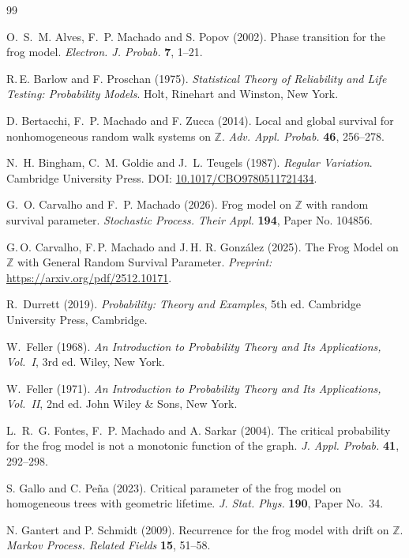 \documentclass[preprint]{imsart}
\newcommand{\1}{\mathbf{1}}
\theoremstyle{plain}
\theoremstyle{definition}
\begin{document}
\begin{thebibliography}{99}

O.~S.~M. Alves, F.~P. Machado and S. Popov (2002).
Phase transition for the frog model.
\textit{Electron. J. Probab.} \textbf{7}, 1--21.


R.\,E. Barlow and F. Proschan (1975).
\emph{Statistical Theory of Reliability and Life Testing: Probability Models}.
Holt, Rinehart and Winston, New York.

D. Bertacchi, F.~P. Machado and F. Zucca (2014).
Local and global survival for nonhomogeneous random walk systems on $\mathbb{Z}$.
\textit{Adv. Appl. Probab.} \textbf{46}, 256--278.

N.~H. Bingham, C.~M. Goldie and J.~L. Teugels (1987).
\emph{Regular Variation}.
Cambridge University Press.
DOI: \href{https://doi.org/10.1017/CBO9780511721434}{10.1017/CBO9780511721434}.

G.~O. Carvalho and F.~P. Machado (2026).
Frog model on $\mathbb{Z}$ with random survival parameter.
\textit{Stochastic Process. Their Appl.} \textbf{194}, Paper No. 104856.

G.\,O. Carvalho, F.\,P. Machado and J.\,H. R. González (2025).
The Frog Model on $\mathbb{Z}$ with General Random Survival Parameter.
\textit{Preprint: }\url{https://arxiv.org/pdf/2512.10171}.

R.~Durrett (2019).
\emph{Probability: Theory and Examples}, 5th ed.
Cambridge University Press, Cambridge.

W.~Feller (1968).
\emph{An Introduction to Probability Theory and Its Applications, Vol.~I}, 3rd ed.
Wiley, New York.

W.~Feller (1971).
\emph{An Introduction to Probability Theory and Its Applications, Vol.~II}, 2nd ed.
John Wiley \& Sons, New York.

L.~R.~G. Fontes, F.~P. Machado and A. Sarkar (2004).
The critical probability for the frog model is not a monotonic function of the graph.
\textit{J. Appl. Probab.} \textbf{41}, 292--298.

S. Gallo and C. Peña (2023).
Critical parameter of the frog model on homogeneous trees with geometric lifetime.
\textit{J. Stat. Phys.} \textbf{190}, Paper No.~34.

N. Gantert and P. Schmidt (2009).
Recurrence for the frog model with drift on $\mathbb{Z}$.
\textit{Markov Process. Related Fields} \textbf{15}, 51--58.



\end{thebibliography}
\end{document}
